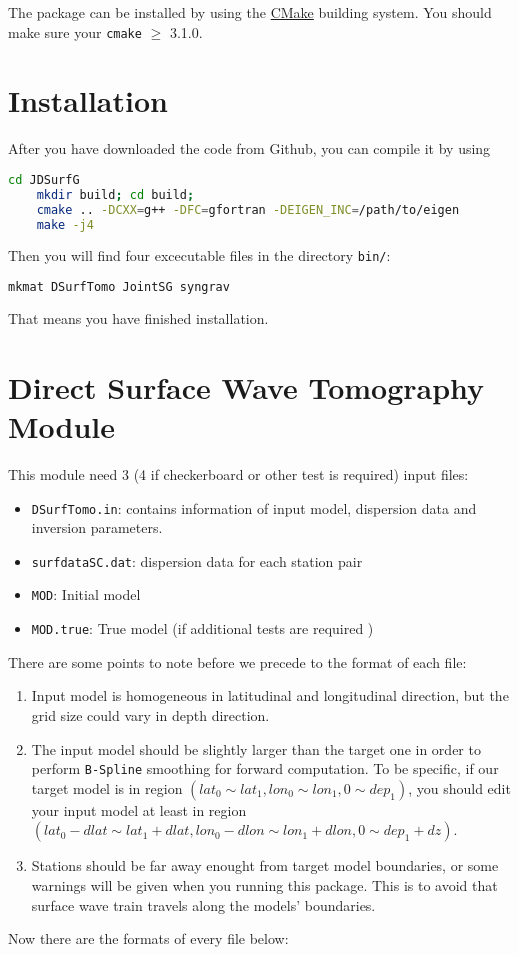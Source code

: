 \documentclass[UTF8]{article}
\begin{document}
The package can be installed by using the \href{https://cmake.org/}{CMake} building system. You should make sure your \texttt{cmake} $\geq$ 3.1.0.

\section{Installation}
After you have downloaded the code from Github,
you can compile it by using
\begin{lstlisting}[language=bash]
    cd JDSurfG
    mkdir build; cd build;
    cmake .. -DCXX=g++ -DFC=gfortran -DEIGEN_INC=/path/to/eigen
    make -j4
\end{lstlisting}
Then you will find four excecutable files in the 
directory \texttt{bin/}:
\begin{lstlisting}[language=bash]
    mkmat DSurfTomo JointSG syngrav  
\end{lstlisting}
That means you have finished installation. \\

\section{Direct Surface Wave Tomography Module} 
This module need 3 (4 if checkerboard or other test 
is required) input files:
\begin{itemize}
\item \verb!DSurfTomo.in!: contains information of 
        input model, dispersion data and inversion 
        parameters.
\item \verb!surfdataSC.dat!: dispersion data for 
            each station pair
\item \verb!MOD!: Initial model
\item \verb!MOD.true!: True model (if 
                        additional tests are required )
\end{itemize}
There are some points to note before we precede to the 
format of each file:
\begin{enumerate}[(1)]
    \item Input model is homogeneous in latitudinal and 
            longitudinal direction, but the grid size 
            could vary in depth direction.
    \item The input model should be slightly larger than
          the target one in order to perform \texttt{B-Spline}
          smoothing for forward computation. To be specific,
         if our target model is in region 
         $(lat_0 \sim lat_1,lon_0\sim lon_1,0\sim dep_1)$, 
        you should edit your input model at least in 
        region $(lat_0-dlat \sim lat_1+dlat, lon_0-dlon \sim lon_1+dlon,0 \sim dep_1+dz)$.
    \item Stations should be far away enought from target model 
            boundaries, or some warnings will be given 
            when you running this package. This is to 
            avoid that surface wave train travels along
            the models' boundaries.
\end{enumerate}
Now there are the formats of every file below:
\end{document}
